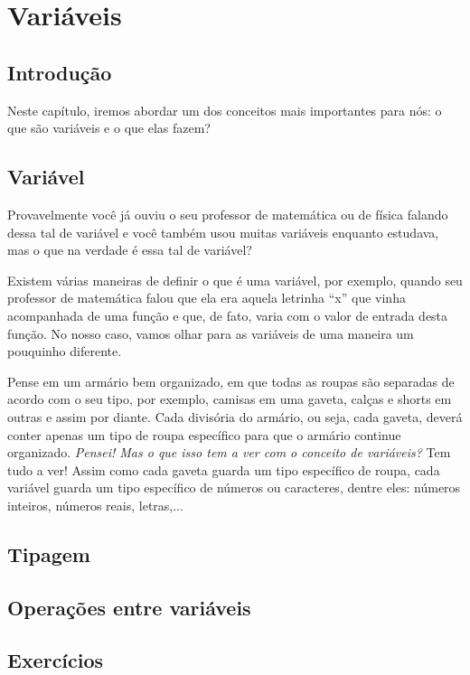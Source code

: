 \chapter{Variáveis}
\section*{Introdução}
    Neste capítulo, iremos abordar um dos conceitos mais importantes para nós: o que são variáveis e o que elas fazem?
\section{Variável}
    Provavelmente você já ouviu o seu professor de matemática ou de física falando dessa tal de variável e você também usou muitas variáveis enquanto estudava, mas o que na verdade é essa tal de variável? \par
    Existem várias maneiras de definir o que é uma variável, por exemplo, quando seu professor de matemática falou que ela era aquela letrinha ``x'' que vinha acompanhada de uma função e que, de fato, varia com o valor de entrada desta função. No nosso caso, vamos olhar para as variáveis de uma maneira um pouquinho diferente. \par
    Pense em um armário bem organizado, em que todas as roupas são separadas de acordo com o seu tipo, por exemplo, camisas em uma gaveta, calças e shorts em outras e assim por diante. Cada divisória do armário, ou seja, cada gaveta, deverá conter apenas um tipo de roupa específico para que o armário continue organizado. 
    \textit{Pensei! Mas o que isso tem a ver com o conceito de variáveis?}
    Tem tudo a ver! Assim como cada gaveta guarda um tipo específico de roupa, cada variável guarda um tipo específico de números ou caracteres, dentre eles: números inteiros, números reais, letras,...
    
\section{Tipagem}

\section{Operações entre variáveis}

\section{Exercícios}

\question{}

\question{}

\question{}

\question{}

\question{}

